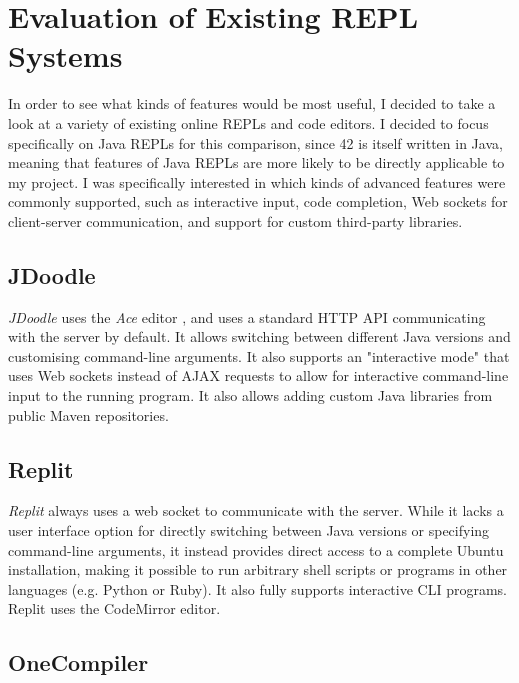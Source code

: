 \chapter{Evaluation of Existing REPL Systems}

In order to see what kinds of features would be most useful, I decided to take a look at a variety of existing online REPLs and code editors. I decided to focus specifically on Java REPLs for this comparison, since 42 is itself written in Java, meaning that features of Java REPLs are more likely to be directly applicable to my project. I was specifically interested in which kinds of advanced features were commonly supported, such as interactive input, code completion, Web sockets for client-server communication, and support for custom third-party libraries.

\section{JDoodle}

\emph{JDoodle} \cite{nutpan-pty-ltd-2022} uses the \emph{Ace} editor \cite{mozilla-2022}, and uses a standard HTTP API communicating with the server by default. It allows switching between different Java versions and customising command-line arguments. It also supports an "interactive mode" that uses Web sockets instead of AJAX requests to allow for interactive command-line input to the running program. It also allows adding custom Java libraries from public Maven repositories.


\section{Replit}

\emph{Replit} \cite{replit-2022} always uses a web socket to communicate with the server. While it lacks a user interface option for directly switching between Java versions or specifying command-line arguments, it instead provides direct access to a complete Ubuntu installation, making it possible to run arbitrary shell scripts or programs in other languages (e.g. Python or Ruby). It also fully supports interactive CLI programs. Replit uses the CodeMirror editor.


\section{OneCompiler}

